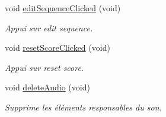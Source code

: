 \begin{DoxyCompactItemize}
\mbox{\label{class_super_simon_a4dd6e368e1dca177272e937209ff4974}} 
void \hyperlink{class_super_simon_a4dd6e368e1dca177272e937209ff4974}{edit\+Sequence\+Clicked} (void)
\begin{DoxyCompactList}\small\item\em Appui sur edit sequence. \end{DoxyCompactList}\item 
void \hyperlink{class_super_simon_a81bff9afba77880d36563aac5534ccd3}{reset\+Score\+Clicked} (void)
\begin{DoxyCompactList}\small\item\em Appui sur reset score. \end{DoxyCompactList}\item 
\mbox{\label{class_super_simon_aa8c1d5cee800c30c2eda3d4e32a438eb}} 
void \hyperlink{class_super_simon_aa8c1d5cee800c30c2eda3d4e32a438eb}{delete\+Audio} (void)
\begin{DoxyCompactList}\small\item\em Supprime les éléments responsables du son. \end{DoxyCompactList}\end{DoxyCompactItemize}
